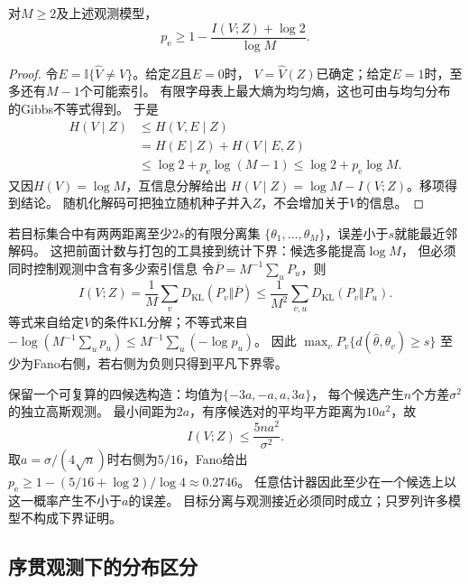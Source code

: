 \begin{theorem}[Fano不等式]
\label{thm:information-fano}
对\(M\geq2\)及上述观测模型，
\begin{equation}
  p_{\mathrm e}\geq1-\frac{I(V;Z)+\log2}{\log M}.
  \label{eq:information-fano}
\end{equation}
\end{theorem}
\begin{proof}
令\(E=\mathbb I\{\widehat V\neq V\}\)。给定\(Z\)且\(E=0\)时，
\(V=\widehat V(Z)\)已确定；给定\(E=1\)时，至多还有\(M-1\)个可能索引。
有限字母表上最大熵为均匀熵，这也可由与均匀分布的Gibbs不等式得到。
于是
\[
\begin{aligned}
  H(V\mid Z)
  &\leq H(V,E\mid Z)\\
  &=H(E\mid Z)+H(V\mid E,Z)\\
  &\leq\log2+p_{\mathrm e}\log(M-1)
   \leq\log2+p_{\mathrm e}\log M.
\end{aligned}
\]
又因\(H(V)=\log M\)，互信息分解给出
\(H(V\mid Z)=\log M-I(V;Z)\)。移项得到结论。
随机化解码可把独立随机种子并入\(Z\)，不会增加关于\(V\)的信息。
\end{proof}

若目标集合中有两两距离至少\(2s\)的有限分离集
\(\{\theta_1,\ldots,\theta_M\}\)，误差小于\(s\)就能最近邻解码。
这把前面计数与打包的工具接到统计下界：候选多能提高\(\log M\)，
但必须同时控制观测中含有多少索引信息
令\(\overline P=M^{-1}\sum_uP_u\)，则
\[
  I(V;Z)=\frac1M\sum_vD_{\mathrm{KL}}(P_v\Vert\overline P)
  \leq\frac1{M^2}\sum_{v,u}D_{\mathrm{KL}}(P_v\Vert P_u).
\]
等式来自给定\(V\)的条件KL分解；不等式来自
\(-\log(M^{-1}\sum_u p_u)\leq M^{-1}\sum_u(-\log p_u)\)。
因此
\(\max_vP_v\{d(\widehat\theta,\theta_v)\geq s\}\)
至少为Fano右侧，若右侧为负则只得到平凡下界零。

保留一个可复算的四候选构造：均值为\(\{-3a,-a,a,3a\}\)，
每个候选产生\(n\)个方差\(\sigma^2\)的独立高斯观测。
最小间距为\(2a\)，有序候选对的平均平方距离为\(10a^2\)，故
\[
  I(V;Z)\leq\frac{5na^2}{\sigma^2}.
\]
取\(a=\sigma/(4\sqrt n)\)时右侧为\(5/16\)，Fano给出
\(p_{\mathrm e}\geq1-(5/16+\log2)/\log4\approx0.2746\)。
任意估计器因此至少在一个候选上以这一概率产生不小于\(a\)的误差。
目标分离与观测接近必须同时成立；只罗列许多模型不构成下界证明。

\subsection{序贯观测下的分布区分}
\label{sec:information-sequential-observations}

